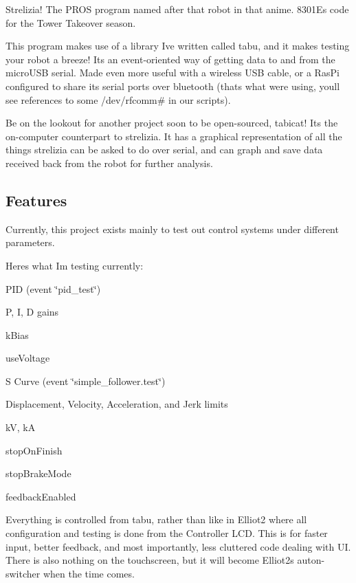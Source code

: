 Strelizia! The P\+R\+OS program named after that robot in that anime. 8301E\textquotesingle{}s code for the Tower Takeover season.

This program makes use of a library I\textquotesingle{}ve written called tabu, and it makes testing your robot a breeze! It\textquotesingle{}s an event-\/oriented way of getting data to and from the micro\+U\+SB serial. Made even more useful with a wireless U\+SB cable, or a Ras\+Pi configured to share its serial ports over bluetooth (that\textquotesingle{}s what we\textquotesingle{}re using, you\textquotesingle{}ll see references to some /dev/rfcomm\# in our scripts).

Be on the lookout for another project soon to be open-\/sourced, tabicat! It\textquotesingle{}s the on-\/computer counterpart to strelizia. It has a graphical representation of all the things strelizia can be asked to do over serial, and can graph and save data received back from the robot for further analysis.

\subsection*{Features}

Currently, this project exists mainly to test out control systems under different parameters.

Here\textquotesingle{}s what I\textquotesingle{}m testing currently\+:
\begin{DoxyItemize}
\item P\+ID (event \char`\"{}pid\+\_\+test\char`\"{})
\begin{DoxyItemize}
\item P, I, D gains
\item k\+Bias
\item use\+Voltage
\end{DoxyItemize}
\item S Curve (event \char`\"{}simple\+\_\+follower.\+test\char`\"{})
\begin{DoxyItemize}
\item Displacement, Velocity, Acceleration, and Jerk limits
\item kV, kA
\item stop\+On\+Finish
\item stop\+Brake\+Mode
\item feedback\+Enabled
\end{DoxyItemize}
\end{DoxyItemize}

Everything is controlled from tabu, rather than like in Elliot2 where all configuration and testing is done from the Controller L\+CD. This is for faster input, better feedback, and most importantly, less cluttered code dealing with UI. There is also nothing on the touchscreen, but it will become Elliot2\textquotesingle{}s auton-\/switcher when the time comes.

